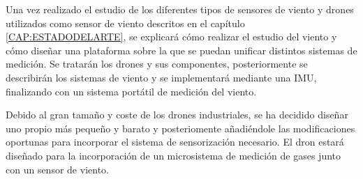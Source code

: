 
Una vez realizado el estudio de los diferentes tipos de sensores de viento y drones utilizados como sensor de viento descritos en el capítulo \ref{CAP:ESTADODELARTE}, se explicará cómo realizar el estudio del viento y cómo diseñar una plataforma sobre la que se puedan unificar distintos sistemas de medición. Se tratarán los drones y sus componentes, posteriormente se describirán los sistemas de viento y se implementará mediante una IMU, finalizando con un sistema portátil de medición del viento.

Debido al gran tamaño y coste de los drones industriales, se ha decidido diseñar uno propio más pequeño y barato y posteriomente añadiéndole las modificaciones oportunas para incorporar el sistema de sensorización necesario. El dron estará diseñado para la incorporación de un microsistema de medición de gases junto con un sensor de viento.
